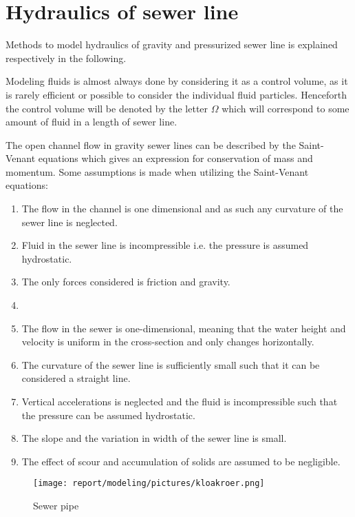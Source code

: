 \section{Hydraulics of sewer line}\label{se:hydraulics_of_sewer_line}

Methods to model hydraulics of gravity and pressurized sewer line is explained respectively in the following. 

Modeling fluids is almost always done by considering it as a control volume, as it is rarely efficient or possible to consider the individual fluid particles.
Henceforth the control volume will be denoted by the letter $\Omega$ which will correspond to some amount of fluid in a length of sewer line.

The open channel flow in gravity sewer lines can be described by the Saint-Venant equations which gives an expression for conservation of mass and momentum.
Some assumptions is made when utilizing the Saint-Venant equations:
\begin{table}[H]
\begin{enumerate}
\item The flow in the channel is one dimensional and as such any curvature of the sewer line is neglected.
\item Fluid in the sewer line is incompressible i.e. the pressure is assumed hydrostatic.
\item The only forces considered is friction and gravity.
\item 




\item The flow in the sewer is one-dimensional, meaning that the water height and velocity is uniform in the cross-section and only changes horizontally.
\item The curvature of the sewer line is sufficiently small such that it can be considered a straight line. 
\item Vertical accelerations is neglected and the fluid is incompressible such that the pressure can be assumed hydrostatic.
\item The slope and the variation in width of the sewer line is small.
\item The effect of scour and accumulation of solids are assumed to be negligible. 
\end{enumerate}
\label{tab:saintbernard_assumptions}
\end{table}


\begin{figure}[H]
\centering
\texttt{[image: report/modeling/pictures/kloakroer.png]}
\caption{Sewer pipe }
\label{fig:kloakroer}
\end{figure}



